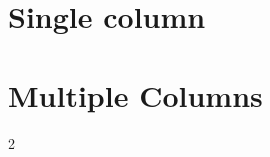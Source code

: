 \documentclass[a4paper]{article}
\begin{document}
\section{Single column}



\section{Multiple Columns}

\begin{multicols}{2}





\end{multicols}
\end{document}
